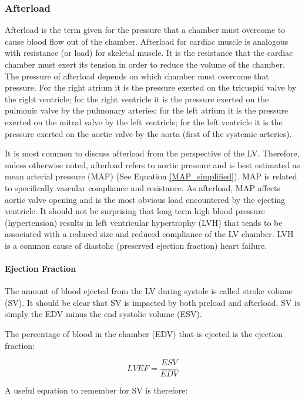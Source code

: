 \subsubsection{Afterload}
Afterload is the term given for the pressure that a chamber must overcome to cause blood flow out of the chamber. Afterload for cardiac muscle is analogous with resistance (or load) for skeletal muscle. It is the resistance that the cardiac chamber must exert its tension in order to reduce the volume of the chamber. The pressure of afterload depends on which chamber must overcome that pressure. For the right atrium it is the pressure exerted on the tricuspid valve by the right ventricle; for the right ventricle it is the pressure exerted on the pulmonic valve by the pulmonary arteries; for the left atrium it is the pressure exerted on the mitral valve by the left ventricle; for the left ventricle it is the pressure exerted on the aortic valve by the aorta (first of the systemic arteries). 

It is most common to discuss afterload from the perspective of the LV. Therefore, unless otherwise noted, afterload refers to aortic pressure and is best estimated as mean arterial pressure (MAP) (See Equation \ref{MAP_simplified}). MAP is related to specifically vascular compliance and resistance. As afterload, MAP affects aortic valve opening and is the most obvious load encountered by the ejecting ventricle. It should not be surprising that long term high blood pressure (hypertension) results in left ventricular hypertrophy (LVH) that tends to be associated with a reduced size and reduced compliance of the LV chamber. LVH is a common cause of diastolic (preserved ejection fraction) heart failure.

\paragraph{Ejection Fraction}

The amount of blood ejected from the LV during systole is called stroke volume (SV). It should be clear that SV is impacted by both preload and afterload. SV is simply the EDV minus the end systolic volume (ESV). 

The percentage of blood in the chamber (EDV) that is ejected is the ejection fraction: 

\begin{equation}
    LVEF = \frac{ESV}{EDV}
    \label{LVEF}
\end{equation}

A useful equation to remember for SV is therefore:

